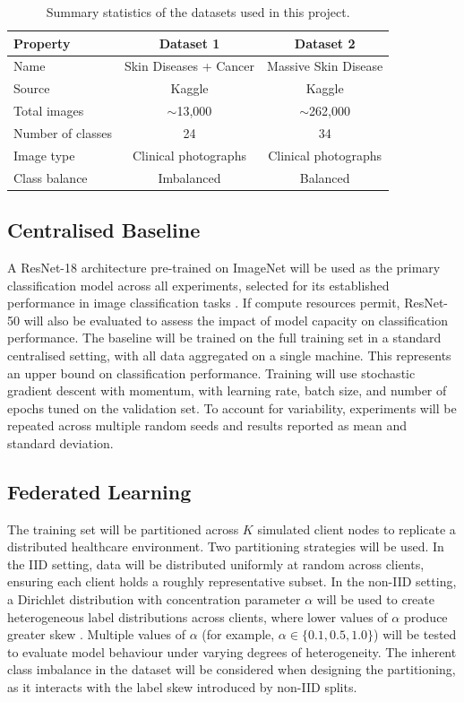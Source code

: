 \documentclass[12pt,openany,a4paper]{book}
\begin{document}
\begin{table}[H]
  \centering
  \caption{Summary statistics of the datasets used in this project.}
  \label{tab:datasets}
  \renewcommand{\arraystretch}{1.3}
  \begin{tabular}{|l|c|c|}
    \hline
    \textbf{Property} & \textbf{Dataset 1} & \textbf{Dataset 2} \\ \hline
    Name & Skin Diseases + Cancer & Massive Skin Disease \\ \hline
    Source & Kaggle & Kaggle \\ \hline
    Total images & $\sim$13,000 & $\sim$262,000 \\ \hline
    Number of classes & 24 & 34 \\ \hline
    Image type & Clinical photographs & Clinical photographs \\ \hline
    Class balance & Imbalanced & Balanced \\ \hline
  \end{tabular}
\end{table}

\subsection{Centralised Baseline}
A ResNet-18 architecture pre-trained on ImageNet will be used as the primary classification model across all experiments, selected for its established performance in image classification tasks \cite{heDeepResidualLearning2015}. If compute resources permit, ResNet-50 will also be evaluated to assess the impact of model capacity on classification performance. The baseline will be trained on the full training set in a standard centralised setting, with all data aggregated on a single machine. This represents an upper bound on classification performance. Training will use stochastic gradient descent with momentum, with learning rate, batch size, and number of epochs tuned on the validation set. To account for variability, experiments will be repeated across multiple random seeds and results reported as mean and standard deviation.
\subsection{Federated Learning}
The training set will be partitioned across $K$ simulated client nodes to replicate a distributed healthcare environment. Two partitioning strategies will be used. In the IID setting, data will be distributed uniformly at random across clients, ensuring each client holds a roughly representative subset. In the non-IID setting, a Dirichlet distribution with concentration parameter $\alpha$ will be used to create heterogeneous label distributions across clients, where lower values of $\alpha$ produce greater skew \cite{hsuMeasuringEffectsNonIdentical2019}. Multiple values of $\alpha$ (for example, $\alpha\in\{0.1,0.5,1.0\}$) will be tested to evaluate model behaviour under varying degrees of heterogeneity. The inherent class imbalance in the dataset will be considered when designing the partitioning, as it interacts with the label skew introduced by non-IID splits.
\end{document}
